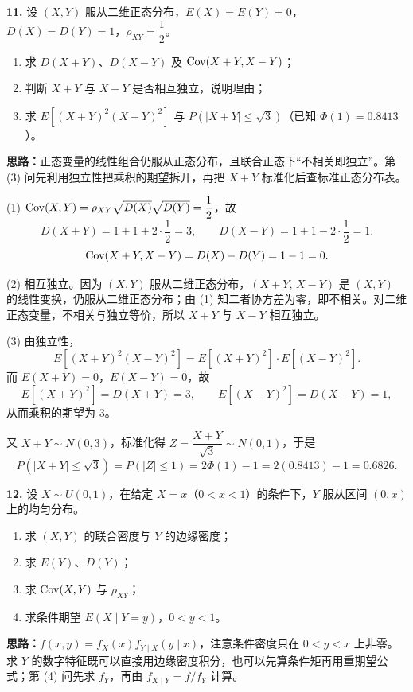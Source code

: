 \textbf{11.} 设 $(X,Y)$ 服从二维正态分布，$E(X)=E(Y)=0$，$D(X)=D(Y)=1$，$\rho_{XY}=\dfrac12$。
\begin{enumerate}[label=(\arabic*)]
    \item 求 $D(X+Y)$、$D(X-Y)$ 及 $\operatorname{Cov}(X+Y,X-Y)$；
    \item 判断 $X+Y$ 与 $X-Y$ 是否相互独立，说明理由；
    \item 求 $E[(X+Y)^2(X-Y)^2]$ 与 $P(|X+Y|\le\sqrt3)$（已知 $\Phi(1)=0.8413$）。
\end{enumerate}

\ifshowsolutions%
\textbf{思路：}正态变量的线性组合仍服从正态分布，且联合正态下“不相关即独立”。第 (3) 问先利用独立性把乘积的期望拆开，再把 $X+Y$ 标准化后查标准正态分布表。

(1) $\operatorname{Cov}(X,Y)=\rho_{XY}\sqrt{D(X)}\sqrt{D(Y)}=\dfrac12$，故
\[
D(X+Y)=1+1+2\cdot\frac12=3,\qquad
D(X-Y)=1+1-2\cdot\frac12=1.
\]
\[
\operatorname{Cov}(X+Y,X-Y)=D(X)-D(Y)=1-1=0.
\]

(2) 相互独立。因为 $(X,Y)$ 服从二维正态分布，$(X+Y,\,X-Y)$ 是 $(X,Y)$ 的线性变换，仍服从二维正态分布；由 (1) 知二者协方差为零，即不相关。对二维正态变量，不相关与独立等价，所以 $X+Y$ 与 $X-Y$ 相互独立。

(3) 由独立性，
\[
E[(X+Y)^2(X-Y)^2]=E[(X+Y)^2]\cdot E[(X-Y)^2].
\]
而 $E(X+Y)=0$，$E(X-Y)=0$，故
\[
E[(X+Y)^2]=D(X+Y)=3,\qquad E[(X-Y)^2]=D(X-Y)=1,
\]
从而乘积的期望为 $3$。

又 $X+Y\sim N(0,3)$，标准化得 $Z=\dfrac{X+Y}{\sqrt3}\sim N(0,1)$，于是
\[
P(|X+Y|\le\sqrt3)=P(|Z|\le1)=2\Phi(1)-1=2(0.8413)-1=0.6826.
\]


\else \answerarea[10] \fi

\textbf{12.} 设 $X\sim U(0,1)$，在给定 $X=x$（$0<x<1$）的条件下，$Y$ 服从区间 $(0,x)$ 上的均匀分布。
\begin{enumerate}[label=(\arabic*)]
    \item 求 $(X,Y)$ 的联合密度与 $Y$ 的边缘密度；
    \item 求 $E(Y)$、$D(Y)$；
    \item 求 $\operatorname{Cov}(X,Y)$ 与 $\rho_{XY}$；
    \item 求条件期望 $E(X\mid Y=y)$，$0<y<1$。
\end{enumerate}

\ifshowsolutions%
\textbf{思路：}$f(x,y)=f_X(x)f_{Y\mid X}(y\mid x)$，注意条件密度只在 $0<y<x$ 上非零。求 $Y$ 的数字特征既可以直接用边缘密度积分，也可以先算条件矩再用重期望公式；第 (4) 问先求 $f_Y$，再由 $f_{X\mid Y}=f/f_Y$ 计算。


